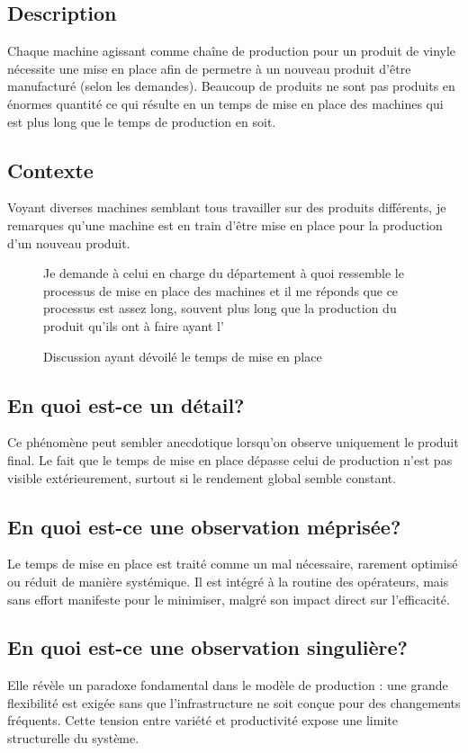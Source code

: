 \documentclass[a11paper]{article}
\newcommand{\boxfig}[3]{%
  \begin{figure}[H]
    \centering
    \begin{tcolorbox}[colback=gray!5!white, colframe=black!50, boxrule=0.5pt,
                      width=0.9\linewidth, arc=3pt, auto outer arc,
                      boxsep=5pt, left=5pt, right=5pt, top=5pt, bottom=5pt]
      #3
    \end{tcolorbox}
    \caption{#1}
    \label{box:#2}
  \end{figure}
}
\begin{document}
\subsection{Description}

Chaque machine agissant comme chaîne de production pour un produit de vinyle
nécessite une mise en place afin de permetre à un nouveau produit d'être
manufacturé (selon les demandes). Beaucoup de produits ne sont pas produits en
énormes quantité ce qui résulte en un temps de mise en place des machines qui
est plus long que le temps de production en soit.

\subsection{Contexte}

Voyant diverses machines semblant tous travailler sur des produits
différents, je remarques qu'une machine est en train d'être mise en place
pour la production d'un nouveau produit.

\boxfig{Discussion ayant dévoilé le temps de mise en place}{setup}{
	Je demande à celui en charge du département à quoi ressemble le
	processus de mise en place des machines et il me réponds que ce processus est
	assez long, souvent plus long que la production du produit qu'ils ont à
	faire ayant l'
}

\subsection{En quoi est-ce un détail?}

Ce phénomène peut sembler anecdotique lorsqu'on observe uniquement le produit final.
Le fait que le temps de mise en place dépasse celui de production n’est pas visible
extérieurement, surtout si le rendement global semble constant.

\subsection{En quoi est-ce une observation méprisée?}

Le temps de mise en place est traité comme un mal nécessaire, rarement optimisé ou
réduit de manière systémique. Il est intégré à la routine des opérateurs, mais sans
effort manifeste pour le minimiser, malgré son impact direct sur l’efficacité.

\subsection{En quoi est-ce une observation singulière?}

Elle révèle un paradoxe fondamental dans le modèle de production : une grande
flexibilité est exigée sans que l’infrastructure ne soit conçue pour des
changements fréquents. Cette tension entre variété et productivité expose une limite
structurelle du système.

\end{document}
